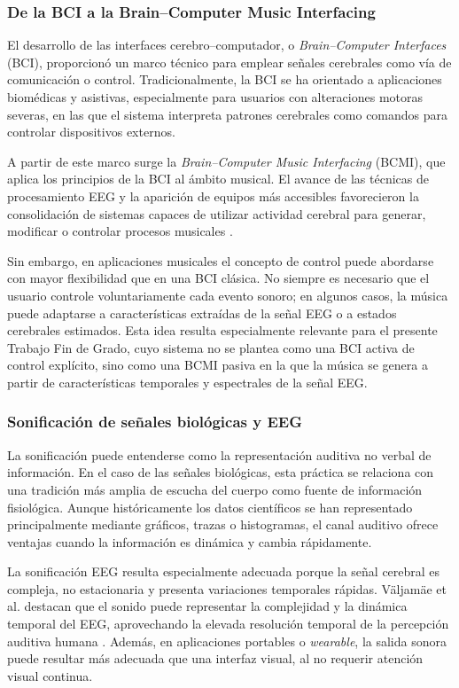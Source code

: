 \documentclass[../main.tex]{subfiles}
\begin{document}
\subsubsection{De la BCI a la Brain--Computer Music Interfacing}

El desarrollo de las interfaces cerebro--computador, o \textit{Brain--Computer Interfaces} (BCI), proporcionó un marco técnico para emplear señales cerebrales como vía de comunicación o control. Tradicionalmente, la BCI se ha orientado a aplicaciones biomédicas y asistivas, especialmente para usuarios con alteraciones motoras severas, en las que el sistema interpreta patrones cerebrales como comandos para controlar dispositivos externos.

A partir de este marco surge la \textit{Brain--Computer Music Interfacing} (BCMI), que aplica los principios de la BCI al ámbito musical. El avance de las técnicas de procesamiento EEG y la aparición de equipos más accesibles favorecieron la consolidación de sistemas capaces de utilizar actividad cerebral para generar, modificar o controlar procesos musicales \cite{MirandaCastet2014Preface}.

Sin embargo, en aplicaciones musicales el concepto de control puede abordarse con mayor flexibilidad que en una BCI clásica. No siempre es necesario que el usuario controle voluntariamente cada evento sonoro; en algunos casos, la música puede adaptarse a características extraídas de la señal EEG o a estados cerebrales estimados. Esta idea resulta especialmente relevante para el presente Trabajo Fin de Grado, cuyo sistema no se plantea como una BCI activa de control explícito, sino como una BCMI pasiva en la que la música se genera a partir de características temporales y espectrales de la señal EEG.

\subsubsection{Sonificación de señales biológicas y EEG}

La sonificación puede entenderse como la representación auditiva no verbal de información. En el caso de las señales biológicas, esta práctica se relaciona con una tradición más amplia de escucha del cuerpo como fuente de información fisiológica. Aunque históricamente los datos científicos se han representado principalmente mediante gráficos, trazas o histogramas, el canal auditivo ofrece ventajas cuando la información es dinámica y cambia rápidamente.

La sonificación EEG resulta especialmente adecuada porque la señal cerebral es compleja, no estacionaria y presenta variaciones temporales rápidas. Väljamäe et al. destacan que el sonido puede representar la complejidad y la dinámica temporal del EEG, aprovechando la elevada resolución temporal de la percepción auditiva humana \cite{Valjamae2013EEGSonification}. Además, en aplicaciones portables o \textit{wearable}, la salida sonora puede resultar más adecuada que una interfaz visual, al no requerir atención visual continua.
\end{document}
